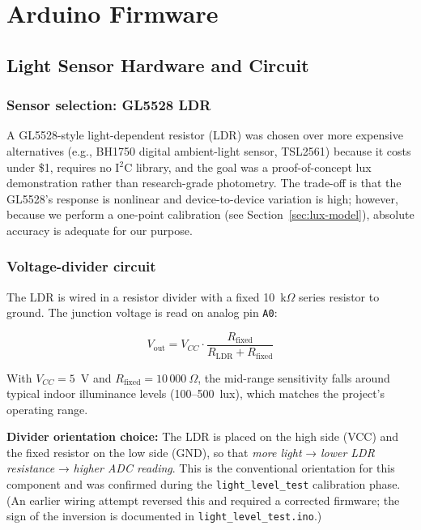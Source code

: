 \documentclass[12pt,letterpaper]{article}
\begin{document}
\section{Arduino Firmware}

\subsection{Light Sensor Hardware and Circuit}

\subsubsection{Sensor selection: GL5528 LDR}

A GL5528-style light-dependent resistor (LDR) was chosen over more expensive
alternatives (e.g., BH1750 digital ambient-light sensor, TSL2561) because it
costs under \$1, requires no I$^2$C library, and the goal was a proof-of-concept
lux demonstration rather than research-grade photometry. The trade-off is that
the GL5528's response is nonlinear and device-to-device variation is high;
however, because we perform a one-point calibration (see
Section~\ref{sec:lux-model}), absolute accuracy is adequate for our purpose.

\subsubsection{Voltage-divider circuit}

The LDR is wired in a resistor divider with a fixed 10~k$\Omega$ series
resistor to ground. The junction voltage is read on analog pin \texttt{A0}:

\[
  V_{\mathrm{out}} = V_{CC} \cdot \frac{R_{\mathrm{fixed}}}{R_{\mathrm{LDR}} + R_{\mathrm{fixed}}}
\]

With $V_{CC} = 5$~V and $R_{\mathrm{fixed}} = 10\,000~\Omega$, the mid-range
sensitivity falls around typical indoor illuminance levels (100–500~lux), which
matches the project's operating range.

\textbf{Divider orientation choice:} The LDR is placed on the high side (VCC)
and the fixed resistor on the low side (GND), so that \emph{more light}
→ \emph{lower LDR resistance} → \emph{higher ADC reading}. This is the
conventional orientation for this component and was confirmed during the
\texttt{light\_level\_test} calibration phase. (An earlier wiring attempt
reversed this and required a corrected firmware; the sign of the
inversion is documented in \texttt{light\_level\_test.ino}.)
\end{document}
